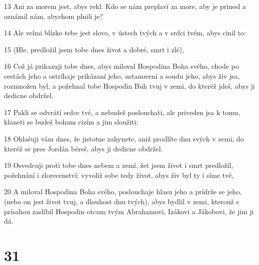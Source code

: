 \par 13 Ani za morem jest, abys rekl: Kdo se nám preplaví za more, aby je prinesl a oznámil nám, abychom plnili je?
\par 14 Ale velmi blízko tebe jest slovo, v ústech tvých a v srdci tvém, abys cinil to:
\par 15 (Hle, predložil jsem tobe dnes život a dobré, smrt i zlé),
\par 16 Což já prikazuji tobe dnes, abys miloval Hospodina Boha svého, chode po cestách jeho a ostríhaje prikázaní jeho, ustanovení a soudu jeho, abys živ jsa, rozmnožen byl, a požehnal tobe Hospodin Buh tvuj v zemi, do kteréž jdeš, abys ji dedicne obdržel.
\par 17 Pakli se odvrátí srdce tvé, a nebudeš poslouchati, ale priveden jsa k tomu, klaneti se budeš bohum cizím a jim sloužiti:
\par 18 Ohlašuji vám dnes, že jistotne zahynete, aniž prodlíte dnu svých v zemi, do kteréž se pres Jordán béreš, abys ji dedicne obdržel.
\par 19 Osvedcuji proti tobe dnes nebem a zemí, žet jsem život i smrt predložil, požehnání i zlorecenství; vyvoliž sobe tedy život, abys živ byl ty i síme tvé,
\par 20 A miloval Hospodina Boha svého, poslouchaje hlasu jeho a prídrže se jeho, (nebo on jest život tvuj, a dlouhost dnu tvých), abys bydlil v zemi, kterouž s prísahou zaslíbil Hospodin otcum tvým Abrahamovi, Izákovi a Jákobovi, že jim ji dá.

\chapter{31}

